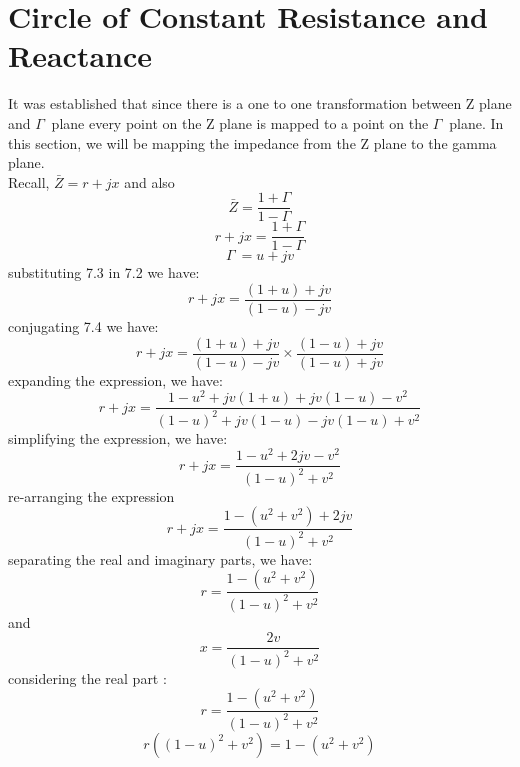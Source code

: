 \section{Circle of Constant Resistance and Reactance}
It was established that since there is a one to one transformation between Z plane and $ \Gamma\ $ plane every point on the Z plane is mapped to a point on the $ \Gamma\ $ plane. In this section, we will be mapping the impedance from the Z plane to the gamma plane.\\
Recall,
$ \bar{Z}= r + jx $ and also
\begin{equation}
\bar{Z}= \frac{1 + \Gamma}{1 - \Gamma}
\end{equation}
\begin{equation}
r + jx =\frac{1 + \Gamma}{1 - \Gamma}
\end{equation}
\begin{equation}
\Gamma\ = u + jv
\end{equation}
substituting 7.3 in 7.2 we have:
\begin{equation}
r + jx = \frac{(1 + u) + jv}{(1 - u) -jv}
\end{equation}
conjugating 7.4 we have:
\begin{equation*}
r + jx = \frac{(1 + u) + jv}{(1 - u) -jv}\times \frac{(1 - u) + jv}{(1 - u) +jv}
\end{equation*}
expanding the expression, we have:
\begin{equation*}
r + jx =\frac{1 - u^2 + jv(1 + u) + jv(1 - u) - v^2}{(1 - u)^2 + jv(1 - u) - jv(1 - u) + v^2} 
\end{equation*}
simplifying the expression, we have:
\begin{equation*}
r + jx = \frac{1 - u^2 + 2jv - v^2}{(1 -u)^2 + v^2}
\end{equation*}
re-arranging the expression
\begin{equation*}
r + jx = \frac{1 - (u^2 + v^2) + 2jv}{(1 - u)^2 + v^2}
\end{equation*}
separating the real and imaginary parts, we have:
\begin{equation}
r = \frac{1 - (u^2 + v^2)}{(1 - u)^2 + v^2}
\end{equation}
and
\begin{equation}
x = \frac{2v}{(1 - u)^2 + v^2}
\end{equation}
considering the real part :	
\begin{equation*}
r = \frac{1 - (u^2 + v^2)}{(1 - u)^2 + v^2}
\end{equation*}
\begin{equation*}
r((1 - u)^2 + v^2) = 1 -(u^2 + v^2)
\end{equation*}
